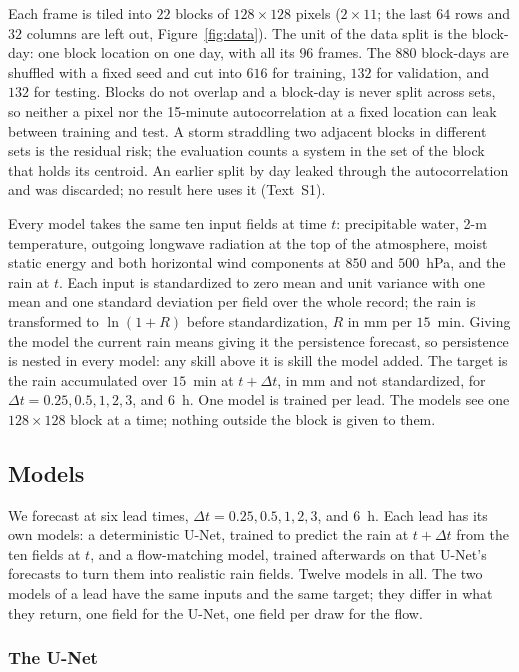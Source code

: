 \documentclass[draft]{agujournal2019}
\begin{document}
Each frame is tiled into $22$ blocks of $128 \times 128$ pixels
($2 \times 11$; the last $64$ rows and $32$ columns are left out,
Figure~\ref{fig:data}). The unit of the data split is the block-day: one
block location on one day, with all its $96$ frames. The $880$ block-days
are shuffled with a fixed seed and cut into $616$ for training, $132$ for
validation, and $132$ for testing. Blocks do not overlap and a block-day
is never split across sets, so neither a pixel nor the 15-minute
autocorrelation at a fixed location can leak between training and test.
A storm straddling two adjacent blocks in different sets is the residual
risk; the evaluation counts a system in the set of the block that holds
its centroid. An earlier split by day leaked through the autocorrelation
and was discarded; no result here uses it (Text~S1).

Every model takes the same ten input fields at time $t$: precipitable
water, 2-m temperature, outgoing longwave radiation at the top of the
atmosphere, moist static energy and both horizontal wind components at
$850$ and $500$~hPa, and the rain at $t$. Each input is standardized to
zero mean and unit variance with one mean and one standard deviation per
field over the whole record; the rain is transformed to $\ln(1 + R)$
before standardization, $R$ in mm per $15$~min. Giving the model the
current rain means giving it the persistence forecast, so persistence is
nested in every model: any skill above it is skill the model added. The
target is the rain accumulated over $15$~min at $t + \Delta t$, in mm
and not standardized, for $\Delta t = 0.25, 0.5, 1, 2, 3$, and $6$~h.
One model is trained per lead. The models see one $128 \times 128$ block
at a time; nothing outside the block is given to them.

\subsection{Models}\label{sec:unet}

We forecast at six lead times, $\Delta t = 0.25, 0.5, 1, 2, 3$, and
$6$~h. Each lead has its own models: a deterministic U-Net, trained to
predict the rain at $t + \Delta t$ from the ten fields at $t$, and a
flow-matching model, trained afterwards on that U-Net's forecasts to turn
them into realistic rain fields. Twelve models in all. The two models of
a lead have the same inputs and the same target; they differ in what they
return, one field for the U-Net, one field per draw for the flow.

\subsubsection{The U-Net}
\end{document}
